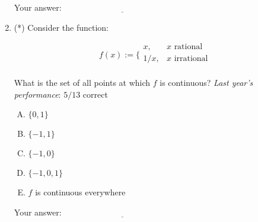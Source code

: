 \documentclass[10pt]{amsart}
\begin{document}
\begin{enumerate}
  \vspace{0.1in}
  Your answer: $\underline{\qquad\qquad\qquad\qquad\qquad\qquad\qquad}$
  \vspace{1.5in}

\item (*) Consider the function:

  $$f(x) := \lbrace\begin{array}{rl} x, & x \text{ rational }\\1/x, & x \text{ irrational }\\\end{array}$$

  What is the set of all points at which $f$ is continuous? {\em Last
    year's performance}: $5/13$ correct

  \begin{enumerate}[(A)]
  \item $\{ 0, 1 \}$
  \item $\{ -1,1 \}$
  \item $\{-1,0 \}$
  \item $\{ -1,0,1 \}$
  \item $f$ is continuous everywhere
  \end{enumerate}

  \vspace{0.1in}
  Your answer: $\underline{\qquad\qquad\qquad\qquad\qquad\qquad\qquad}$
  \vspace{1.5in}

\end{enumerate}
\end{document}
